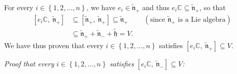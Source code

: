 \documentclass[etingof-lie.tex]{subfiles}
\begin{document}
For every $i\in\left\{  1,2,...,n\right\}  $, we have $e_{i}\in
\widetilde{\mathfrak{n}}_{+}$ and thus $e_{i}\mathbb{C}\subseteq
\widetilde{\mathfrak{n}}_{+}$, so that%
\begin{align*}
\left[  e_{i}\mathbb{C},\ \widetilde{\mathfrak{n}}_{+}\right]   &
\subseteq\left[  \widetilde{\mathfrak{n}}_{+},\ \widetilde{\mathfrak{n}}%
_{+}\right]  \subseteq\widetilde{\mathfrak{n}}_{+}\ \ \ \ \ \ \ \ \ \ \left(
\text{since }\widetilde{\mathfrak{n}}_{+}\text{ is a Lie algebra}\right) \\
&  \subseteq\widetilde{\mathfrak{n}}_{+}+\widetilde{\mathfrak{n}}%
_{-}+\widetilde{\mathfrak{h}}=V.
\end{align*}
We have thus proven that every $i\in\left\{  1,2,...,n\right\}  $ satisfies
$\left[  e_{i}\mathbb{C},\ \widetilde{\mathfrak{n}}_{+}\right]  \subseteq V$.

\textit{Proof that every }$i\in\left\{  1,2,...,n\right\}  $\textit{ satisfies
}$\left[  e_{i}\mathbb{C},\ \widetilde{\mathfrak{n}}_{-}\right]  \subseteq
V$\textit{:}
\end{document}
